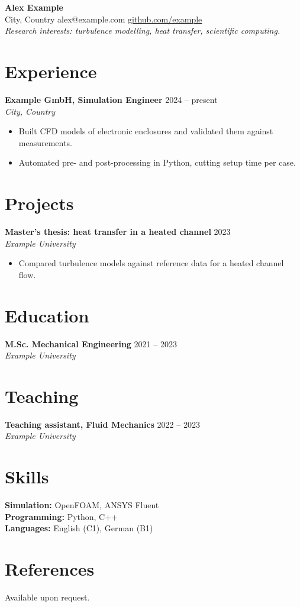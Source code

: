 \documentclass[10pt]{article}
\newcommand{\entry}[3]{\textbf{#1} \hfill #3\\ \textit{#2}\\}
\begin{document}
{\LARGE\bfseries Alex Example}\\[2pt]
City, Country \textbullet{} alex@example.com \textbullet{} \href{https://github.com/example}{github.com/example}\\[4pt]
\textit{Research interests: turbulence modelling, heat transfer, scientific computing.}

\section{Experience}
\entry{Example GmbH, Simulation Engineer}{City, Country}{2024 -- present}
\begin{itemize}
  \item Built CFD models of electronic enclosures and validated them against measurements.
  \item Automated pre- and post-processing in Python, cutting setup time per case.
\end{itemize}

\section{Projects}
\entry{Master's thesis: heat transfer in a heated channel}{Example University}{2023}
\begin{itemize}
  \item Compared turbulence models against reference data for a heated channel flow.
\end{itemize}

\section{Education}
\entry{M.Sc. Mechanical Engineering}{Example University}{2021 -- 2023}

\section{Teaching}
\entry{Teaching assistant, Fluid Mechanics}{Example University}{2022 -- 2023}

\section{Skills}
\textbf{Simulation:} OpenFOAM, ANSYS Fluent\\
\textbf{Programming:} Python, C++\\
\textbf{Languages:} English (C1), German (B1)

\section{References}
Available upon request.
\end{document}
